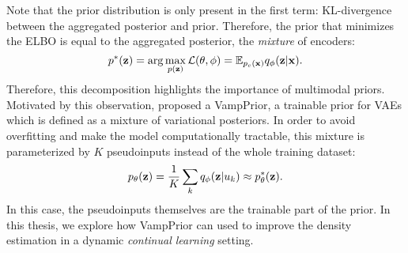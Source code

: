 Note that the prior distribution is only present in the first term: KL-divergence between the aggregated posterior and prior. Therefore, the prior that minimizes the ELBO is equal to the aggregated posterior, the \textit{mixture} of encoders:
\begin{equation}
    p^*({\mathbf{z}}) = \arg\max_{p({\mathbf{z}})}\mathcal{L}(\theta, \phi) = \mathbb{E}_{p_e({\mathbf{x}})}q_{\phi}({\mathbf{z}}|{\mathbf{x}}).
\end{equation}
Therefore, this decomposition highlights the importance of multimodal priors. 
Motivated by this observation, \citet{tomczak2018vae} proposed a VampPrior, a trainable prior for VAEs which is defined as a mixture of variational posteriors. In order to avoid overfitting and make the model computationally tractable, this mixture is parameterized by $K$ pseudoinputs instead of the whole training dataset:
\begin{equation}
    p_{\theta}({\mathbf{z}}) = \frac1K \sum_k q_{\phi}({\mathbf{z}}|u_k) \approx p_{\theta}^*({\mathbf{z}}).
\end{equation}
In this case, the pseudoinputs themselves are the trainable part of the prior. In this thesis, we explore how VampPrior can used to improve the density estimation in a dynamic \textit{continual learning} setting. 


